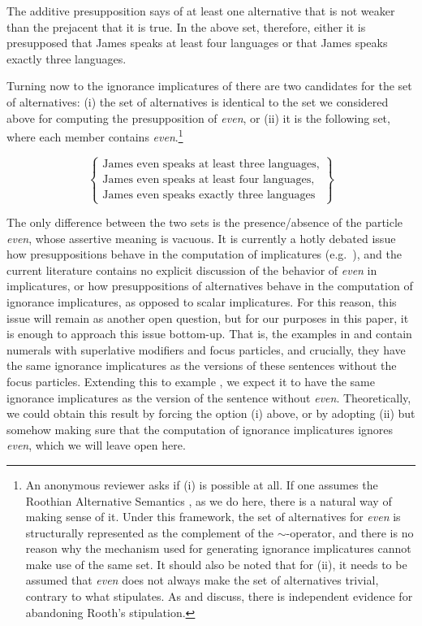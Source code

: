 \documentclass[output=paper]{langscibook}
\begin{document}
The additive presupposition says of at least one alternative that is not weaker than the prejacent that it is true. In the above set, therefore, either it is presupposed that James speaks at least four languages or that James speaks exactly three languages.

Turning now to the ignorance implicatures of  there are two candidates for the set of alternatives: (i) the set of alternatives is identical to the set we considered above for computing the presupposition of \textit{even}, or (ii) it is the following set, where each member contains \textit{even}.\footnote{An anonymous reviewer asks if (i) is possible at all. If one assumes the Roothian Alternative Semantics \citep{rooth:92}, as we do here, there is a natural way of making sense of it. Under this framework, the set of alternatives for \textit{even} is structurally represented as the complement of the $\mathord{\sim}$-operator, and there is no reason why the mechanism used for generating ignorance implicatures cannot make use of the same set. It should also be noted that for (ii), it needs to be assumed that \textit{even} does not always make the set of alternatives trivial, contrary to what \citet{rooth:92} stipulates. As \citet{krifka:91} and \citet{panizzasudo} discuss, there is independent evidence for abandoning Rooth's stipulation.}

  \[\left\{\begin{array}{l}
    \text{James even speaks at least three languages,}\\
    \text{James even speaks {at least four} languages,}\\
    \text{James even speaks {exactly three} languages}
  \end{array}\right\}\]

\noindent The only difference between the two sets is the presence/absence of the particle \textit{even}, whose assertive meaning is vacuous. It is currently a hotly debated issue how presuppositions behave in the computation of implicatures (e.g.\ \citealt{gajewskisharvit, spectorsudo, marty, anvari}), and the current literature contains no explicit discussion of the behavior of \textit{even} in implicatures, or how presuppositions of alternatives behave in the computation of ignorance implicatures, as opposed to scalar implicatures. For this reason, this issue will remain as another open question, but for our purposes in this paper, it is enough to approach this issue bottom-up. That is, the examples in  and  contain numerals with superlative modifiers and focus particles, and crucially, they have the same ignorance implicatures as the versions of these sentences without the focus particles. Extending this to example , we expect it to have the same ignorance implicatures as the version of the sentence without \textit{even}. Theoretically, we could obtain this result by forcing the option (i) above, or by adopting (ii) but somehow making sure that the computation of ignorance implicatures ignores \textit{even}, which we will leave open here.
\end{document}
